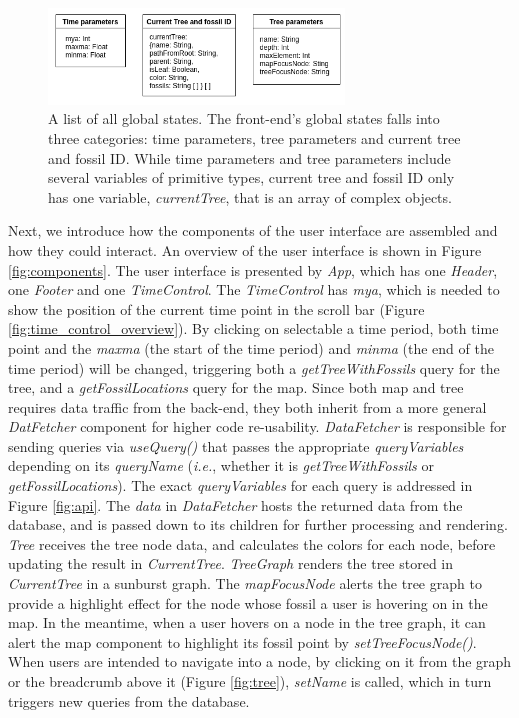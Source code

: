 \documentclass[11pt, a4paper,oneside,chapterprefix=false]{scrbook}
\begin{document}
\newpage
\begin{figure}[h]
	\centering
	\includegraphics[width=0.7\textwidth]{figures/implementation/global_state}
	\caption{A list of all global states. The front-end's global states falls into three categories: time parameters, tree parameters and current tree and fossil ID. While time parameters and tree parameters include several variables of primitive types, current tree and fossil ID only has one variable, \emph{currentTree}, that is an array of complex objects.}
	\label{fig:global_state}
\end{figure}


Next, we introduce how the components of the user interface are assembled and how they could interact. An overview of the user interface is shown in Figure \ref{fig:components}. The user interface is presented by \emph{App}, which has one \emph{Header}, one \emph{Footer} and one \emph{TimeControl}. The \emph{TimeControl} has \emph{mya}, which is needed to show the position of the current time point in the scroll bar (Figure \ref{fig:time_control_overview}). By clicking on selectable a time period, both time point and the \emph{maxma} (the start of the time period) and \emph{minma} (the end of the time period) will be changed, triggering both a \emph{getTreeWithFossils} query for the tree, and a \emph{getFossilLocations} query for the map. Since both map and tree requires data traffic from the back-end, they both inherit from a more general \emph{DatFetcher} component for higher code re-usability. \emph{DataFetcher} is responsible for sending queries via \emph{useQuery()} that passes the appropriate \emph{queryVariables} depending on its \emph{queryName} (\emph{i.e.}, whether it is \emph{getTreeWithFossils} or \emph{getFossilLocations}). The exact \emph{queryVariables} for each query is addressed in Figure \ref{fig:api}. The \emph{data} in \emph{DataFetcher} hosts the returned data from the database, and is passed down to its children for further processing and rendering. \\

\emph{Tree} receives the tree node data, and calculates the colors for each node, before updating the result in \emph{CurrentTree}. \emph{TreeGraph} renders the tree stored in \emph{CurrentTree} in a sunburst graph. The \emph{mapFocusNode} alerts the tree graph to provide a highlight effect for the node whose fossil a user is hovering on in the map. In the meantime, when a user hovers on a node in the tree graph, it can alert the map component to highlight its fossil point by \emph{setTreeFocusNode()}. When users are intended to navigate into a node, by clicking on it from the graph or the breadcrumb above it (Figure \ref{fig:tree}), \emph{setName} is called, which in turn triggers new queries from the database. \\
\end{document}
